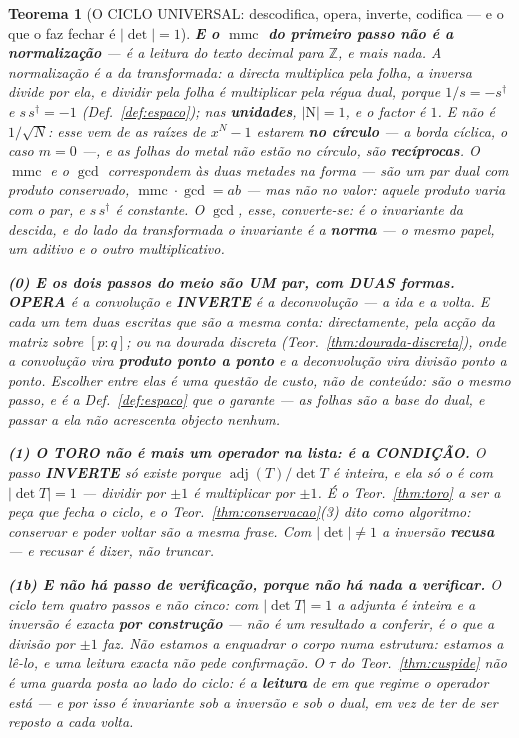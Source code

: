 \documentclass[11pt,a4paper]{article}
\newtheorem{teorema}{Teorema}
\newcommand{\abs}[1]{\lvert #1\rvert}
\newcommand{\dg}{^{\dagger}}
\begin{document}
\begin{teorema}[O CICLO UNIVERSAL: descodifica, opera, inverte, codifica --- e o que o
faz fechar é $\abs{\det}=1$]
\textbf{E o $\operatorname{mmc}$ do primeiro passo não é a normalização} --- é a
\emph{leitura} do texto decimal para $\mathbb{Z}$, e mais nada. A normalização é a da
transformada: a directa multiplica pela folha, a inversa divide por ela, e \emph{dividir
pela folha é multiplicar pela régua dual}, porque $1/s=-s\dg$ e $s\,s\dg=-1$
(Def.~\ref{def:espaco}); nas \textbf{unidades}, $\abs{\mathrm{N}}=1$, e o factor é $1$.
\emph{E não é $1/\sqrt N$}: esse vem de as raízes de $x^{N}-1$ estarem \textbf{no círculo}
--- a borda cíclica, o caso $m=0$ ---, e as folhas do metal não estão no círculo, são
\textbf{recíprocas}. O $\operatorname{mmc}$ e o $\gcd$ correspondem às duas metades
\emph{na forma} --- são um par dual com produto conservado, $\operatorname{mmc}\cdot\gcd
=ab$ --- mas não no valor: aquele produto \emph{varia} com o par, e $s\,s\dg$ é constante.
\emph{O $\gcd$, esse, converte-se}: é o invariante da descida, e do lado da transformada o
invariante é a \textbf{norma} --- o mesmo papel, um aditivo e o outro multiplicativo.

\textbf{(0) E os dois passos do meio são UM par, com DUAS formas.} \textbf{OPERA} é a
convolução e \textbf{INVERTE} é a deconvolução --- a ida e a volta. E cada um tem duas
escritas que são a mesma conta: \emph{directamente}, pela acção da matriz sobre $[p:q]$;
ou \emph{na dourada discreta} (Teor.~\ref{thm:dourada-discreta}), onde a convolução vira
\textbf{produto ponto a ponto} e a deconvolução vira divisão ponto a ponto. \emph{Escolher
entre elas é uma questão de custo, não de conteúdo}: são o mesmo passo, e é a
Def.~\ref{def:espaco} que o garante --- as folhas são a base do dual, e passar a ela não
acrescenta objecto nenhum.

\textbf{(1) O TORO não é mais um operador na lista: é a CONDIÇÃO.} O passo
\textbf{INVERTE} só existe porque $\operatorname{adj}(T)/\det T$ é \emph{inteira}, e ela
só o é com $\abs{\det T}=1$ --- dividir por $\pm1$ é multiplicar por $\pm1$. É o
Teor.~\ref{thm:toro} a ser a peça que fecha o ciclo, e o
Teor.~\ref{thm:conservacao}(3) dito como algoritmo: \emph{conservar e poder voltar são a
mesma frase}. Com $\abs{\det}\neq1$ a inversão \textbf{recusa} --- e recusar é dizer, não
truncar.

\textbf{(1b) E não há passo de verificação, porque não há nada a verificar.} O ciclo tem
\emph{quatro} passos e não cinco: com $\abs{\det T}=1$ a adjunta é inteira e a inversão é
exacta \textbf{por construção} --- não é um resultado a conferir, é o que a divisão por
$\pm1$ faz. \emph{Não estamos a enquadrar o corpo numa estrutura: estamos a lê-lo}, e uma
leitura exacta não pede confirmação. O $\tau$ do Teor.~\ref{thm:cuspide} não é uma guarda
posta ao lado do ciclo: é a \textbf{leitura} de em que regime o operador está --- e por isso
é invariante sob a inversão e sob o dual, em vez de ter de ser reposto a cada volta.


\end{teorema}
\end{document}
